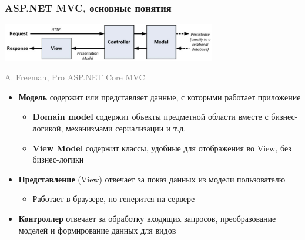 \documentclass[xetex,mathserif,serif]{beamer}
\newcommand{\attribution}[1] {
	\begin{flushright}\begin{scriptsize}\textcolor{gray}{#1}\end{scriptsize}\end{flushright}
}
\begin{document}
	\begin{frame}
		\frametitle{ASP.NET MVC, основные понятия}
		\begin{center}
			\includegraphics[width=0.7\textwidth]{mvc.png}
			\vspace{-5mm}
			\attribution{\textcopyright A. Freeman, Pro ASP.NET Core MVC}
		\end{center}

		\vspace{-5mm}

		\begin{itemize}
			\item \textbf{Модель} содержит или представляет данные, с которыми работает приложение
			\begin{itemize}
				\item \textbf{Domain model} содержит объекты предметной области вместе с бизнес-логикой, механизмами сериализации и т.д.
				\item \textbf{View Model} содержит классы, удобные для отображения во View, без бизнес-логики
			\end{itemize}
			\item \textbf{Представление} (View) отвечает за показ данных из модели пользователю
			\begin{itemize}
				\item Работает в браузере, но генерится на сервере
			\end{itemize}
			\item \textbf{Контроллер} отвечает за обработку входящих запросов, преобразование моделей и формирование данных для видов
		\end{itemize}
	\end{frame}
\end{document}
